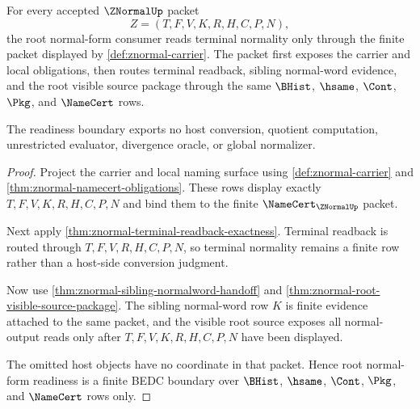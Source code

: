 \begin{theorem}
\label{thm:znormal-root-normal-form-readiness}
For every accepted $\ZNormalUp$ packet
$$
Z=(T,F,V,K,R,H,C,P,N),
$$
the root normal-form consumer reads terminal normality only through the finite
packet displayed by \autoref{def:znormal-carrier}. The packet first exposes
the carrier and local obligations, then routes terminal readback, sibling
normal-word evidence, and the root visible source package through the same
$\BHist$, $\hsame$, $\Cont$, $\Pkg$, and $\NameCert$ rows.

The readiness boundary exports no host conversion, quotient computation,
unrestricted evaluator, divergence oracle, or global normalizer.
\end{theorem}
\begin{proof}
Project the carrier and local naming surface using \autoref{def:znormal-carrier}
and \autoref{thm:znormal-namecert-obligations}. These rows display exactly
$T,F,V,K,R,H,C,P,N$ and bind them to the finite $\NameCert_{\ZNormalUp}$
packet.

Next apply \autoref{thm:znormal-terminal-readback-exactness}. Terminal
readback is routed through $T,F,V,R,H,C,P,N$, so terminal normality remains a
finite row rather than a host-side conversion judgment.

Now use \autoref{thm:znormal-sibling-normalword-handoff} and
\autoref{thm:znormal-root-visible-source-package}. The sibling normal-word row
$K$ is finite evidence attached to the same packet, and the visible root
source exposes all normal-output reads only after $T,F,V,K,R,H,C,P,N$ have
been displayed.

The omitted host objects have no coordinate in that packet. Hence root
normal-form readiness is a finite BEDC boundary over $\BHist$, $\hsame$,
$\Cont$, $\Pkg$, and $\NameCert$ rows only.
\end{proof}

